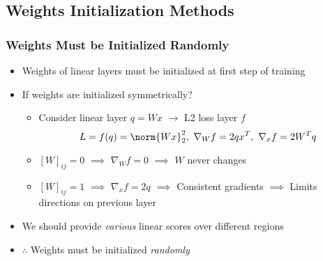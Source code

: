 \begin{figures}
\end{figures}

\subsection{Weights Initialization Methods}

\subsubsection*{Weights Must be Initialized Randomly}
\begin{itemize}
    \item Weights of linear layers must be initialized at first step of training
    \item If weights are initialized symmetrically?
    \begin{itemize}
        \item Consider linear layer $q=Wx$ $\to$ L2 loss layer $f$
        \begin{equation}
            L=f(q)=\norm{Wx}_2^2,~\nabla_Wf=2qx^T,~\nabla_xf=2W^Tq
        \end{equation}
        \item $[W]_{ij}=0$ $\implies$ $\nabla_Wf=0$ $\implies$ $W$ never changes
        \item $[W]_{ij}=1$ $\implies$ $\nabla_xf=2q$ $\implies$ Consistent gradients $\implies$ Limits directions on previous layer
    \end{itemize}
    \item We should provide \textit{various} linear scores over different regions
    \item $\therefore$ Weights must be initialized \textit{randomly}
\end{itemize}

